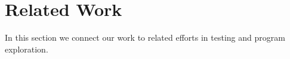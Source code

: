 \section{Related Work}
\label{sec:nanomaly:related-work}
In this section we connect our work to related efforts in
testing and program exploration.



